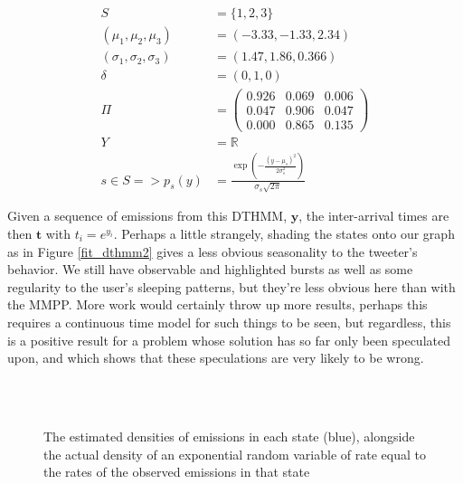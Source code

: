 \begin{align*}
S &= \{1,2,3\}\\
(\mu_1, \mu_2, \mu_3) &= (-3.33, -1.33, 2.34)\\
(\sigma_1, \sigma_2, \sigma_3) &= (1.47, 1.86, 0.366)\\
\delta &= (0,1,0)\\
\Pi &= 
\left(
	\begin{matrix}
     0.926 & 0.069 & 0.006 \\
     0.047 & 0.906 & 0.047 \\
     0.000 & 0.865 & 0.135
	\end{matrix}
\right)\\
Y &= \mathbb{R}\\
s \in S => p_s(y) &= \frac{\exp({-\frac{(y-\mu_s)^2}{2\sigma_s^2}})}{\sigma_s\sqrt{2\pi}}
\end{align*}

Given a sequence of emissions from this DTHMM, $\mathbf{y}$, the inter-arrival times are then $\mathbf{t}$ with $t_i = e^{y_i}$. Perhaps a little strangely, shading the states onto our graph as in Figure \ref{fit_dthmm2} gives a less obvious seasonality to the tweeter's behavior. We still have observable and highlighted bursts as well as some regularity to the user's sleeping patterns, but they're less obvious here than with the MMPP. More work would certainly throw up more results, perhaps this requires a continuous time model for such things to be seen, but regardless, this is a positive result for a problem whose solution has so far only been speculated upon, and which shows that these speculations are very likely to be wrong.
\clearpage

\begin{figure}
\centering
{}
 \\

 \\
\caption{The estimated densities of emissions in each state (blue), alongside the actual density of an exponential random variable of rate equal to the rates of the observed emissions in that state}
\label{densities_mmpp1}
\end{figure}

